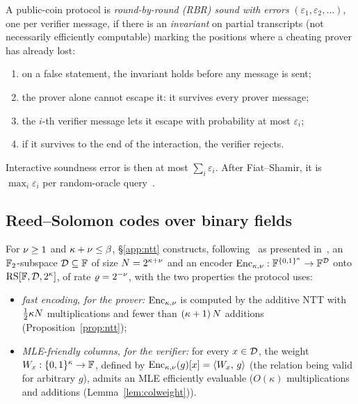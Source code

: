 \begin{definition}\label{def:rbr}
A public-coin protocol is \emph{round-by-round (RBR) sound with errors} $(\varepsilon_1, \varepsilon_2, \dots)$, one per verifier message, if there is an \emph{invariant} on partial transcripts (not necessarily efficiently computable) marking the positions where a cheating prover has already lost:
\begin{enumerate}[itemsep=1pt,label=(\roman*)]
\item on a false statement, the invariant holds before any message is sent;
\item the prover alone cannot escape it: it survives every prover message;
\item the $i$-th verifier message lets it escape with probability at most $\varepsilon_i$;
\item if it survives to the end of the interaction, the verifier rejects.
\end{enumerate}
\end{definition}

Interactive soundness error is then at most $\sum_i \varepsilon_i$. After Fiat--Shamir, it is $\max_i \varepsilon_i$ per random-oracle query~\cite{CCHLRR19,BCS16}.

\subsection{Reed--Solomon codes over binary fields}\label{sec:binary-rs}

For $\nu \ge 1$ and $\kappa + \nu \le \beta$, \S\ref{app:ntt} constructs, following~\cite{LCH14} as presented in~\cite{DP26}, an $\mathbb{F}_2$-subspace $\mathcal{D} \subseteq \mathbb{F}$ of size $N = 2^{\kappa+\nu}$ and an encoder $\mathrm{Enc}_{\kappa,\nu} : \mathbb{F}^{\{0,1\}^{\kappa}} \to \mathbb{F}^{\mathcal{D}}$ onto $\mathrm{RS}[\mathbb{F}, \mathcal{D}, 2^{\kappa}]$, of rate $\varrho = 2^{-\nu}$, with the two properties the protocol uses:
\begin{itemize}[itemsep=2pt]
\item \emph{fast encoding, for the prover:} $\mathrm{Enc}_{\kappa,\nu}$ is computed by the additive NTT with $\tfrac12 \kappa N$ multiplications and fewer than $(\kappa + 1)\, N$ additions (Proposition~\ref{prop:ntt});
\item \emph{MLE-friendly columns, for the verifier:} for every $x \in \mathcal{D}$, the weight $W_x : \{0,1\}^{\kappa} \to \mathbb{F}$, defined by $\mathrm{Enc}_{\kappa,\nu}(g)[x] = \langle W_x,\, g \rangle$ (the relation being valid for arbitrary $g$), admits an MLE efficiently evaluable ($O(\kappa)$ multiplications and additions (Lemma~\ref{lem:colweight})).
\end{itemize}

